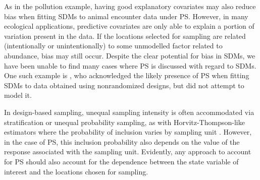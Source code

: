 \documentclass[times,mee,doublespace,]{besauth2}
\begin{document}
As in the pollution example, having good explanatory covariates may also reduce bias when fitting SDMs to animal encounter data under PS.  However, in many ecological applications, predictive covariates are only able to explain a portion of variation present in the data.  If the locations selected for sampling are related (intentionally or unintentionally) to some unmodelled factor related to abundance, bias may still occur.  Despite the clear potential for bias in SDMs, we have been unable to find many cases where PS \citep[\textit{sensu}][]{DiggleEtAl2010} is discussed with regard to SDMs.  One such example is
\citet{ChakrabortyEtAl2010}, who acknowledged the likely presence of PS when fitting SDMs to data obtained using nonrandomized designs, but did not attempt to model it.

In design-based sampling, unequal sampling intensity is often accommodated via stratification or unequal probability sampling, as with Horvitz-Thompson-like estimators where the probability of inclusion varies by sampling unit \citep{Cochran1977}.  However, in the case of PS, this inclusion probability also depends on the value of the response associated with the sampling unit.  Evidently, any approach to account for PS should also account for the dependence between the state variable of interest and the locations chosen for sampling.
\end{document}
